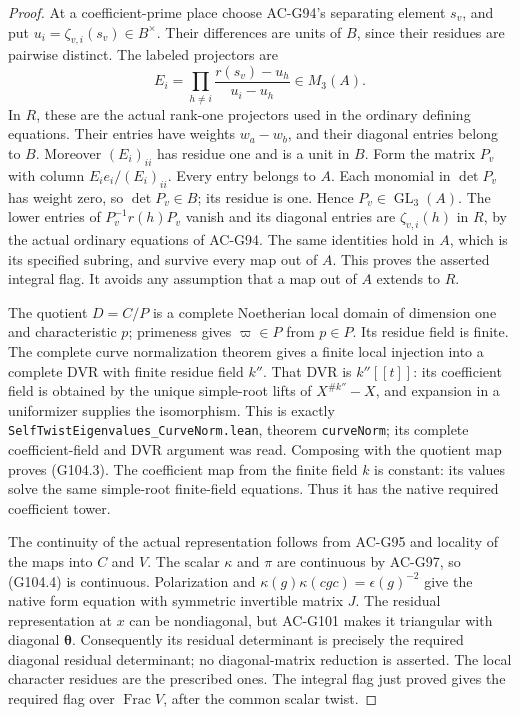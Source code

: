 \begin{proof}
At a coefficient-prime place choose AC-G94's separating element
\(s_v\), and put \(u_i=\zeta_{v,i}(s_v)\in B^\times\).
Their differences are units of \(B\), since their residues are
pairwise distinct.  The labeled projectors are
\[
 E_i=\prod_{h\ne i}\frac{r(s_v)-u_h}{u_i-u_h}\in M_3(A).
\tag{G104.5}
\]
In \(R\), these are the actual rank-one projectors used in the
ordinary defining equations.  Their entries have weights
\(w_a-w_b\), and their diagonal entries belong to \(B\).
Moreover \((E_i)_{ii}\) has residue one and is a unit in \(B\).
Form the matrix \(P_v\) with column
\(E_ie_i/(E_i)_{ii}\).  Every entry belongs to \(A\).
Each monomial in \(\det P_v\) has weight zero, so
\(\det P_v\in B\); its residue is one.  Hence
\(P_v\in\operatorname{GL}_3(A)\).
The lower entries of \(P_v^{-1}r(h)P_v\) vanish and its
diagonal entries are \(\zeta_{v,i}(h)\) in \(R\), by the actual
ordinary equations of AC-G94.  The same identities hold in
\(A\), which is its specified subring, and survive every map
out of \(A\).  This proves the asserted integral flag.
It avoids any assumption that a map out of \(A\) extends to \(R\).

The quotient \(D=C/P\) is a complete Noetherian local domain
of dimension one and characteristic \(p\); primeness gives
\(\varpi\in P\) from \(p\in P\).  Its residue field is finite.
The complete curve normalization theorem gives a finite local
injection into a complete DVR with finite residue field \(k''\).
That DVR is \(k''[[t]]\): its coefficient field is obtained by
the unique simple-root lifts of \(X^{\#k''}-X\), and expansion
in a uniformizer supplies the isomorphism.  This is exactly
\texttt{SelfTwistEigenvalues\_CurveNorm.lean}, theorem
\texttt{curveNorm}; its complete coefficient-field and DVR
argument was read.  Composing with the quotient map proves (G104.3).
The coefficient map from the finite field \(k\) is constant:
its values solve the same simple-root finite-field equations.
Thus it has the native required coefficient tower.

The continuity of the actual representation follows from AC-G95
and locality of the maps into \(C\) and \(V\).  The scalar
\(\kappa\) and \(\pi\) are continuous by AC-G97, so (G104.4)
is continuous.  Polarization and
\(\kappa(g)\kappa(cgc)=\epsilon(g)^{-2}\) give the native
form equation with symmetric invertible matrix \(J\).
The residual representation at \(x\) can be nondiagonal, but
AC-G101 makes it triangular with diagonal \(\boldsymbol\theta\).
Consequently its residual determinant is precisely the required
diagonal residual determinant; no diagonal-matrix reduction is
asserted.  The local character residues are the prescribed ones.
The integral flag just proved gives the required flag over
\(\operatorname{Frac}V\), after the common scalar twist.


\end{proof}
